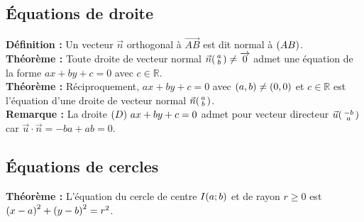 \documentclass[a4paper,titlepage]{article}
\let\oldleft\left
\renewcommand{\left}{\mathopen{}\mathclose\bgroup\oldleft}
\let\oldright\right
\renewcommand{\right}{\aftergroup\egroup\oldright}
\begin{document}
    \subsection{Équations de droite}
        \textbf{Définition :} Un vecteur $\vec{n}$ orthogonal à $\overrightarrow{AB}$ est dit normal à $\left(AB\right)$.
        \\
        \textbf{Théorème :} Toute droite de vecteur normal $\vec{n}\left(\begin{smallmatrix}a\\b\end{smallmatrix}\right)\neq\overrightarrow{0}$ admet une équation de la forme $ax+by+c=0$ avec $c\in\mathbb{R}$.
        \\
        \textbf{Théorème :} Réciproquement, $ax+by+c=0$ avec $\left(a,b\right)\neq\left(0,0\right)$ et $c\in\mathbb{R}$ est l’équation d’une droite de vecteur normal $\vec{n}\left(\begin{smallmatrix}a\\b\end{smallmatrix}\right)$.
        \\
        \textbf{Remarque :} La droite $\left(D\right)~ax+by+c=0$ admet pour vecteur directeur $\vec{u}\left(\begin{smallmatrix}-b\\a\end{smallmatrix}\right)$ car $\vec{u}\cdot\vec{n}=-ba+ab=0$.
    \subsection{Équations de cercles}
        \textbf{Théorème :} L’équation du cercle de centre $I\left(a;b\right)$ et de rayon $r\geqslant0$ est $\left(x-a\right)^{2}+\left(y-b\right)^{2}=r^{2}$.
\null\newpage
{}
\null\newpage
\null\newpage
\end{document}
